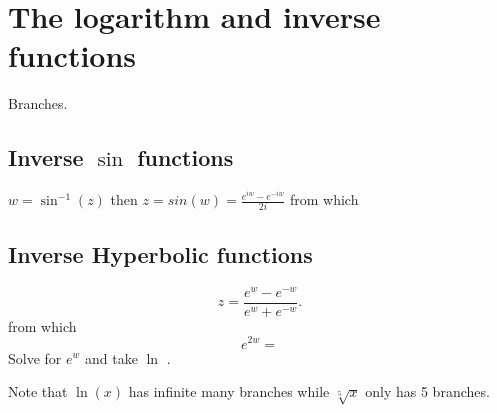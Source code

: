 \section{The logarithm and inverse functions}

Branches.
\subsection{Inverse \(\sin\) functions}

$w=\sin^{-1}(z)$ then $z=sin(w)=\frac{e^{iw}-e^{-iw}}{2i}$ from which 

\subsection{Inverse Hyperbolic functions}
\[z=\frac{e^{w}-e^{-w}}{e^{w}+e^{-w}}.\] from which 
\[e^{2w} =  \] 
Solve for $e^{w}$ and take $\ln$ .

Note that $\ln(x)$ has infinite many branches while $\sqrt[5]{x}$ only has 5 branches.

